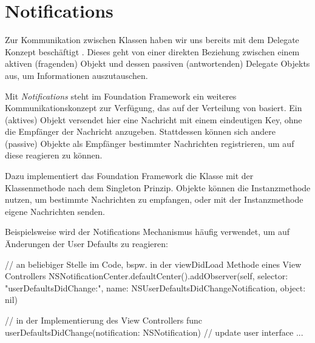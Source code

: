 \documentclass[parskip=half, final]{scrreprt}
\begin{document}
\section{Notifications}

Zur Kommunikation zwischen Klassen haben wir uns bereits mit dem Delegate Konzept beschäftigt . Dieses geht von einer direkten Beziehung zwischen einem aktiven (fragenden) Objekt und dessen passiven (antwortenden) Delegate Objekts aus, um Informationen auszutauschen.

Mit \emph{Notifications} steht im Foundation Framework ein weiteres Kommunikationskonzept zur Verfügung, das auf der Verteilung von  basiert. Ein (aktives) Objekt versendet hier eine Nachricht mit einem eindeutigen Key, ohne die Empfänger der Nachricht anzugeben. Stattdessen können sich andere (passive) Objekte als Empfänger bestimmter Nachrichten registrieren, um auf diese reagieren zu können.

Dazu implementiert das Foundation Framework die Klasse  mit der Klassenmethode  nach dem Singleton Prinzip. Objekte können die Instanzmethode  nutzen, um bestimmte Nachrichten zu empfangen, oder mit der Instanzmethode  eigene Nachrichten senden.

Beispielsweise wird der Notifications Mechanismus häufig verwendet, um auf Änderungen der User Defaults  zu reagieren:

\begin{swiftcode}
// an beliebiger Stelle im Code, bspw. in der viewDidLoad Methode eines View Controllers
NSNotificationCenter.defaultCenter().addObserver(self, selector: "userDefaultsDidChange:", name: NSUserDefaultsDidChangeNotification, object: nil)

// in der Implementierung des View Controllers
func userDefaultsDidChange(notification: NSNotification) {
    // update user interface ...
}
\end{swiftcode}


\end{document}
